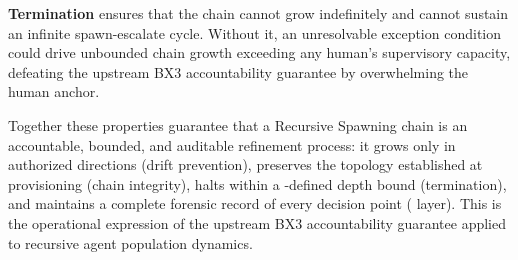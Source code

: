 \medskip
\textbf{Termination} ensures that the chain cannot grow indefinitely and cannot sustain an infinite spawn-escalate cycle. Without it, an unresolvable exception condition could drive unbounded chain growth exceeding any human's supervisory capacity, defeating the upstream BX3 accountability guarantee by overwhelming the human anchor.

Together these properties guarantee that a Recursive Spawning chain is an accountable, bounded, and auditable refinement process: it grows only in authorized directions (drift prevention), preserves the topology established at provisioning (chain integrity), halts within a \purpose{}-defined depth bound (termination), and maintains a complete forensic record of every decision point (\fact{} layer). This is the operational expression of the upstream BX3 accountability guarantee applied to recursive agent population dynamics.